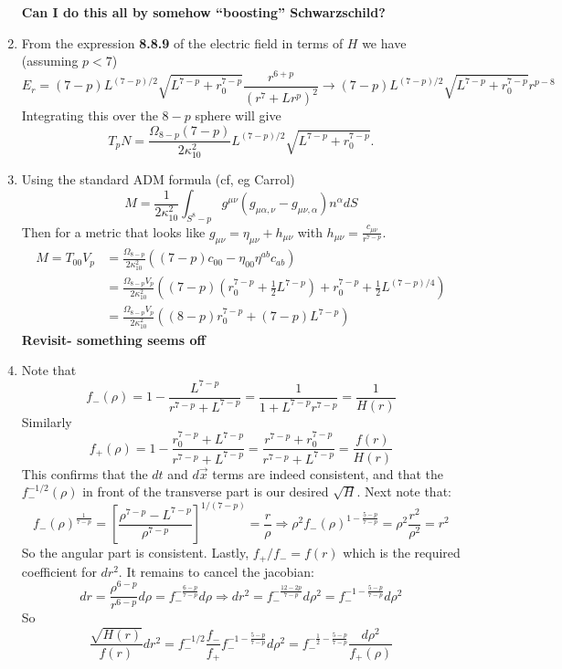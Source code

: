 \documentclass[11pt, class=article, crop=false]{standalone}
\begin{document}
\begin{enumerate}
	
	\textbf{Can I do this all by somehow ``boosting'' Schwarzschild?}
	
	\item From the expression \textbf{8.8.9} of the electric field in terms of $H$ we have (assuming $p < 7$)
	\[
		E_r = (7-p) L^{(7-p)/2} \sqrt{L^{7-p} + r_0^{7-p}} \frac{r^{6+p}}{(r^{7} + L r^{p})^2} \to (7-p) L^{(7-p)/2} \sqrt{L^{7-p} + r_0^{7-p}} r^{p-8}
	\]
	Integrating this over the $8-p$ sphere will give
	\[
		T_p N = \frac{\Omega_{8-p} (7-p)}{2 \kappa_{10}^2} L^{(7-p)/2} \sqrt{L^{7-p} + r_0^{7-p}}.
	\]
	
	\item Using the standard ADM formula (cf, eg Carrol)
	\[
		M = \frac{1}{2 \kappa_{10}^2} \int_{S^8-p} g^{\mu \nu} (g_{\mu \alpha, \nu} - g_{\mu \nu, \alpha}) n^\alpha dS
	\]
	Then for a metric that looks like $g_{\mu \nu} = \eta_{\mu \nu} + h_{\mu \nu}$ with $h_{\mu \nu} = \frac{c_{\mu \nu}}{r^{7-p}}$.
	\[
	\begin{aligned}
		M = T_{00} V_p & = \frac{\Omega_{8-p}}{2 \kappa_{10}^2} ((7-p) c_{00} - \eta_{00} \eta^{ab} c_{ab} )\\
		& = \frac{\Omega_{8-p} V_p}{2 \kappa_{10}^2} ( (7-p) (r_0^{7-p} + \frac12 L^{7-p}) + r_0^{7-p} + \frac12 L^{(7-p)/4} )\\
		&= \frac{\Omega_{8-p} V_p}{2 \kappa_{10}^2} ((8-p) r_0^{7-p} + (7-p) L^{7-p} )
	\end{aligned}
	\]
	\textbf{Revisit- something seems off}
	
	\item Note that
	\[
		f_-(\rho) = 1 - \frac{L^{7-p}}{r^{7-p} + L^{7-p}} = \frac{1}{1+ L^{7-p}{r^{7-p}}} = \frac1{H(r)}
	\]
	Similarly
	\[
		f_+(\rho) = 1 - \frac{r_0^{7-p} + L^{7-p}}{r^{7-p} + L^{7-p}} = \frac{r^{7-p} + r_0^{7-p}}{r^{7-p} + L^{7-p}} = \frac{f(r)}{H(r)}
	\]
	This confirms that the $dt$ and $d\vec x$ terms are indeed consistent, and that the $f^{-1/2}_-(\rho)$ in front of the transverse part is our desired $\sqrt{H}$. Next note that:
	\[
		f_-(\rho)^{\frac{1}{7-p}} = \left[\frac{\rho^{7-p} - L^{7-p}}{\rho^{7-p}} \right]^{1/(7-p)} = \frac{r}{\rho} \Rightarrow \rho^2 f_-(\rho)^{1-\frac{5-p}{7-p}} = \rho^2 \frac{r^2}{\rho^2} = r^2
	\]
	So the angular part is consistent. Lastly, $f_+/f_- = f(r)$ which is the required coefficient for $dr^2$. It remains to cancel the jacobian:
	\[
		dr  = \frac{\rho^{6-p}} {r^{6-p}} d\rho = f_-^{-\frac{6-p}{7-p}} d\rho \Rightarrow dr^2 = f_-^{-\frac{12-2p}{7-p}} d \rho^2 = f_-^{-1-\frac{5-p}{7-p}} d \rho^2
	\]
	So
	\[
		\frac{\sqrt{H(r)}}{f(r)} dr^2 = f_-^{-1/2} \frac{f_-}{f_+} f_-^{-1-\frac{5-p}{7-p}} d \rho^2 = f_-^{-\frac12 - \frac{5-p}{7-p}} \frac{d\rho^2}{f_+(\rho)}
	\]
	

\end{enumerate}
\end{document}
